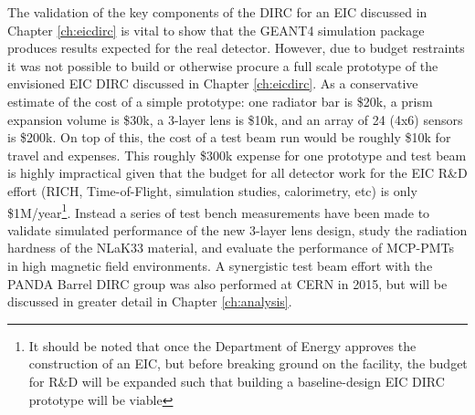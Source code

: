 \label{ch:components}
The validation of the key components of the DIRC for an EIC discussed in Chapter \ref{ch:eicdirc} is vital to show that the GEANT4 simulation package produces results expected for the real detector. However, due to budget restraints it was not possible to build or otherwise procure a full scale prototype of the envisioned EIC DIRC discussed in Chapter \ref{ch:eicdirc}. As a conservative estimate of the cost of a simple prototype: one radiator bar is \$20k, a prism expansion volume is \$30k, a 3-layer lens is \$10k, and an array of 24 (4x6) sensors is \$200k. On top of this, the cost of a test beam run would be roughly \$10k for travel and expenses.  This roughly \$300k expense for one prototype and test beam is highly impractical given that the budget for all detector work for the EIC R\&D effort (RICH, Time-of-Flight, simulation studies, calorimetry, etc) is only \$1M/year\footnote{It should be noted that once the Department of Energy approves the construction of an EIC, but before breaking ground on the facility, the budget for R\&D will be expanded such that building a baseline-design EIC DIRC prototype will be viable}. Instead a series of test bench measurements have been made to validate simulated performance of the new 3-layer lens design, study the radiation hardness of the NLaK33 material, and evaluate the performance of MCP-PMTs in high magnetic field environments. A synergistic test beam effort with the PANDA Barrel DIRC group was also performed at CERN in 2015, but will be discussed in greater detail in Chapter \ref{ch:analysis}.

